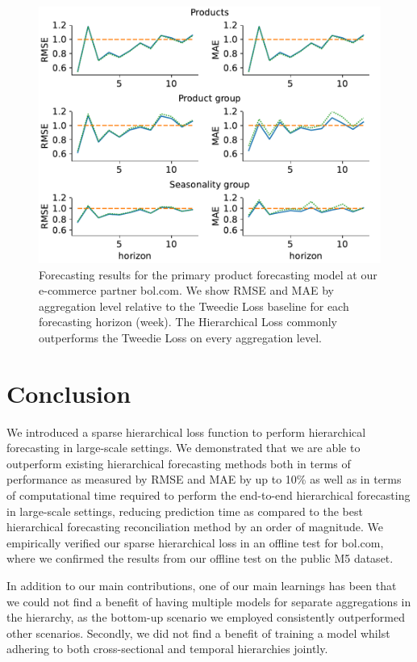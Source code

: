\documentclass[preprint, 3p, times, twocolumn]{elsarticle}
\begin{document}
  \begin{figure}[t] 
    \includegraphics[width=\columnwidth, keepaspectratio]{assets/bol_levels.pdf}
    \caption{Forecasting results for the primary product forecasting model at our e-commerce partner bol.com. We show RMSE and MAE by aggregation level relative to the Tweedie Loss baseline for each forecasting horizon (week). The Hierarchical Loss commonly outperforms the Tweedie Loss on every aggregation level.}
    \label{fig:bol_level_results}
  \end{figure}


\section{Conclusion} \label{sec:conclusion}
  We introduced a sparse hierarchical loss function to perform hierarchical forecasting in large-scale settings. We demonstrated that we are able to outperform existing hierarchical forecasting methods both in terms of performance as measured by RMSE and MAE by up to 10\% as well as in terms of computational time required to perform the end-to-end hierarchical forecasting in large-scale settings, reducing prediction time as compared to the best hierarchical forecasting reconciliation method by an order of magnitude. We empirically verified our sparse hierarchical loss in an offline test for bol.com, where we confirmed the results from our offline test on the public M5 dataset. 

  In addition to our main contributions, one of our main learnings has been that we could not find a benefit of having multiple models for separate aggregations in the hierarchy, as the bottom-up scenario we employed consistently outperformed other scenarios. Secondly, we did not find a benefit of training a model whilst adhering to both cross-sectional and temporal hierarchies jointly. 
\end{document}
